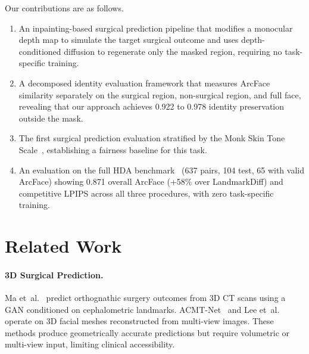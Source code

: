 \documentclass[runningheads]{llncs}
\begin{document}
Our contributions are as follows.
\begin{enumerate}
\item An inpainting-based surgical prediction pipeline that modifies a
monocular depth map to simulate the target surgical outcome and uses
depth-conditioned diffusion to regenerate only the masked region,
requiring no task-specific training.
\item A decomposed identity evaluation framework that measures ArcFace
similarity separately on the surgical region, non-surgical region, and
full face, revealing that our approach achieves 0.922 to 0.978 identity
preservation outside the mask.
\item The first surgical prediction evaluation stratified by the Monk
Skin Tone Scale~\cite{monk2023monk}, establishing a fairness baseline
for this task.
\item An evaluation on the full HDA benchmark~\cite{rathgeb2020plastic}
(637 pairs, 104 test, 65 with valid ArcFace) showing 0.871 overall ArcFace (+58\%
over LandmarkDiff) and competitive LPIPS across all three procedures,
with zero task-specific training.
\end{enumerate}

\section{Related Work}
\label{sec:related}

\paragraph{3D Surgical Prediction.}
Ma et~al.~\cite{ma2023gposc} predict orthognathic surgery outcomes
from 3D CT scans using a GAN conditioned on cephalometric landmarks.
ACMT-Net~\cite{li2023acmt} and Lee et~al.~\cite{lee2022prediction}
operate on 3D facial meshes reconstructed from multi-view images.
These methods produce geometrically accurate predictions but require
volumetric or multi-view input, limiting clinical accessibility.
\end{document}
